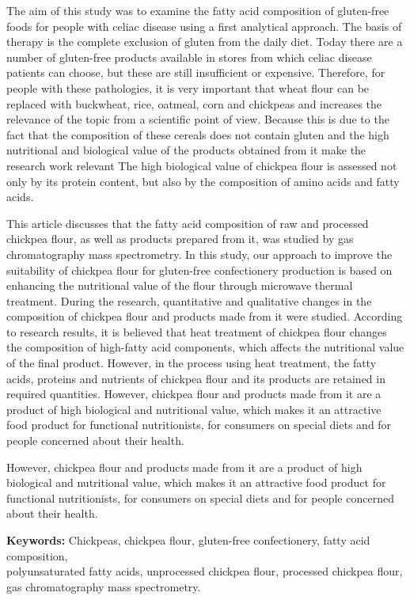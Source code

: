 The aim of this study was to examine the fatty acid composition of
gluten-free foods for people with celiac disease using a first
analytical approach. The basis of therapy is the complete exclusion of
gluten from the daily diet. Today there are a number of gluten-free
products available in stores from which celiac disease patients can
choose, but these are still insufficient or expensive. Therefore, for
people with these pathologies, it is very important that wheat flour can
be replaced with buckwheat, rice, oatmeal, corn and chickpeas and
increases the relevance of the topic from a scientific point of view.
Because this is due to the fact that the composition of these cereals
does not contain gluten and the high nutritional and biological value of
the products obtained from it make the research work relevant The high
biological value of chickpea flour is assessed not only by its protein
content, but also by the composition of amino acids and fatty acids.

This article discusses that the fatty acid composition of raw and
processed chickpea flour, as well as products prepared from it, was
studied by gas chromatography mass spectrometry. In this study, our
approach to improve the suitability of chickpea flour for gluten-free
confectionery production is based on enhancing the nutritional value of
the flour through microwave thermal treatment. During the research,
quantitative and qualitative changes in the composition of chickpea
flour and products made from it were studied. According to research
results, it is believed that heat treatment of chickpea flour changes
the composition of high-fatty acid components, which affects the
nutritional value of the final product. However, in the process using
heat treatment, the fatty acids, proteins and nutrients of chickpea
flour and its products are retained in required quantities. However,
chickpea flour and products made from it are a product of high
biological and nutritional value, which makes it an attractive food
product for functional nutritionists, for consumers on special diets and
for people concerned about their health.

However, chickpea flour and products made from it are a product of high
biological and nutritional value, which makes it an attractive food
product for functional nutritionists, for consumers on special diets and
for people concerned about their health.

{\bfseries Keywords:} Chickpeas, chickpea flour, gluten-free confectionery,
fatty acid composition, \\polyunsaturated fatty acids, unprocessed
chickpea flour, processed chickpea flour, gas chromatography mass
spectrometry.

